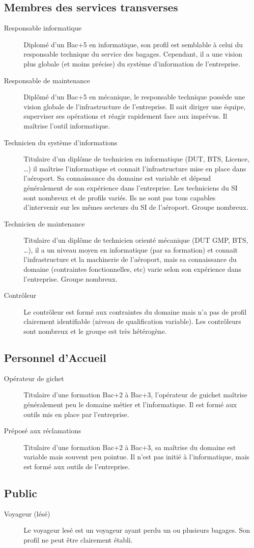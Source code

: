 \documentclass{article}
\begin{document}
\subsection{Membres des services transverses}
\begin{description}
\item[Responsable informatique] Diplomé d'un Bac+5 en informatique, son profil
est semblable à celui du responsable technique du service des bagages.
Cependant, il a une vision plus globale (et moins précise) du système
d'information de l'entreprise.
\item[Responsable de maintenance] Diplômé d'un Bac+5 en mécanique, le
responsable technique possède une vision globale de l'infrastructure de
l'entreprise. Il sait diriger une équipe, superviser ses opérations et réagir
rapidement face aux imprévus. Il maîtrise l'outil informatique.
\item[Technicien du système d'informations] Titulaire d'un diplôme de technicien
en informatique (DUT, BTS, Licence, \ldots) il maîtrise l'informatique et
connait l'infrastructure mise en place dans l'aéroport. Sa connaissance du
domaine est variable et dépend généralement de son expérience dans l'entreprise.
Les techniciens du SI sont nombreux et de profils variés. Ils ne sont pas tous
capables d'intervenir sur les mêmes secteurs du SI de l'aéroport. Groupe
nombreux.
\item[Technicien de maintenance] Titulaire d'un diplôme de technicien orienté
mécanique (DUT GMP, BTS, \ldots), il a un niveau moyen en informatique (par sa
formation) et connait l'infrastructure et la machinerie de l'aéroport, mais sa
connaissance du domaine (contraintes fonctionnelles, etc) varie selon son
expérience dans l'entreprise. Groupe nombreux. 
\item[Contrôleur] Le contrôleur est formé aux contraintes du domaine mais n'a
pas de profil clairement identifiable (niveau de qualification variable). Les
contrôleurs sont nombreux et le groupe est très hétérogène.
\end{description}

\subsection{Personnel d'Accueil}
\begin{description}
\item[Opérateur de gichet] Titulaire d'une formation Bac+2 à Bac+3, l'opérateur
de guichet maîtrise généralement peu le domaine métier et l'informatique. Il est
formé aux outils mis en place par l'entreprise.
\item[Préposé aux réclamations] Titulaire d'une formation Bac+2 à Bac+3, sa
maîtrise du domaine est variable mais souvent peu pointue. Il n'est pas initié à
l'informatique, mais est formé aux outils de l'entreprise.
\end{description}

\subsection{Public}
\begin{description}
\item[Voyageur (lésé)] Le voyageur lesé est un voyageur ayant perdu un ou
plusieurs bagages. Son profil ne peut être clairement établi.
\end{description}
\end{document}

